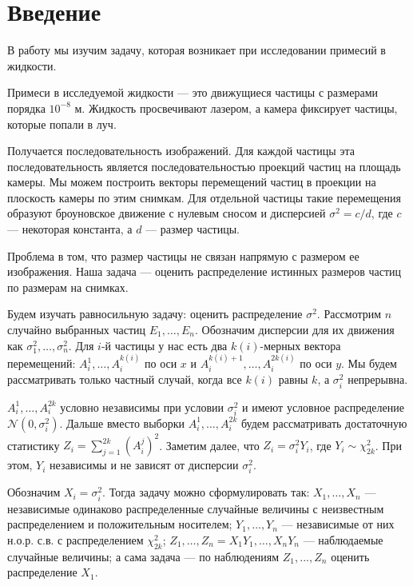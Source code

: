 \documentclass[../paper.tex]{subfiles}
\begin{document}
\chapter{Введение}
В работу мы изучим задачу, которая возникает при исследовании примесий в жидкости.

Примеси в исследуемой жидкости --- это движущиеся частицы с размерами порядка $10^{-8}$ м.
Жидкость просвечивают лазером, а камера фиксирует частицы, которые попали в луч.

Получается последовательность изображений. Для каждой частицы эта последовательность является
последовательностью проекций частиц на площадь камеры. Мы можем построить векторы перемещений
частиц в проекции на плоскость камеры по этим снимкам. Для отдельной частицы такие перемещения
образуют броуновское движение с нулевым сносом и дисперсией $\sigma^2 = c/d$, где $c$ --- некоторая
константа, а $d$ --- размер частицы.

Проблема в том, что размер частицы не связан напрямую с размером ее изображения. Наша задача ---
оценить распределение истинных размеров частиц по размерам на снимках.

Будем изучать равносильную задачу: оценить распределение $\sigma^2$.
Рассмотрим $n$ случайно выбранных частиц $E_1, \dots, E_n$. Обозначим дисперсии для
их движения как $\sigma_1^2, \dots, \sigma_n^2$. Для $i$-й частицы у нас есть два
$k(i)$-мерных вектора перемещений: $A_i^1, \dots, A_i^{k(i)}$ по оси $x$ 
и $A_i^{k(i)+1}, \dots, A_i^{2k(i)}$ по оси $y$. Мы будем рассматривать только частный случай,
когда все $k(i)$ равны $k$, а $\sigma_i^2$ непрерывна.

$A_i^1, \dots, A_i^{2k}$ условно независимы при условии $\sigma_i^2$ и имеют условное
распределение $\mathcal{N}\left(0, \sigma_i^2\right)$. Дальше вместо выборки
$A_i^1, \dots, A_i^{2k}$ будем рассматривать достаточную статистику $Z_i = \sum\limits_{j=1}^{2k} \left(A_i^j\right)^2$.
Заметим далее, что $Z_i = \sigma_i^2 Y_i$, где $Y_i \sim \chi^2_{2k}$.
При этом, $Y_i$ независимы и не зависят от дисперсии $\sigma_i^2$.

Обозначим $X_i = \sigma_i^2$. Тогда задачу можно сформулировать так:
$X_1, \dots, X_n$ --- независимые одинаково распределенные случайные величины
с неизвестным распределением и положительным носителем; 
$Y_1, \dots, Y_n$ --- независимые от них н.о.р. с.в. с распределением $\chi^2_{2k}$;
$Z_1, \dots, Z_n = X_1 Y_1, \dots, X_n Y_n$ --- наблюдаемые случайные величины;
а сама задача --- по наблюдениям $Z_1, ..., Z_n$ оценить распределение $X_1$.
\end{document}
